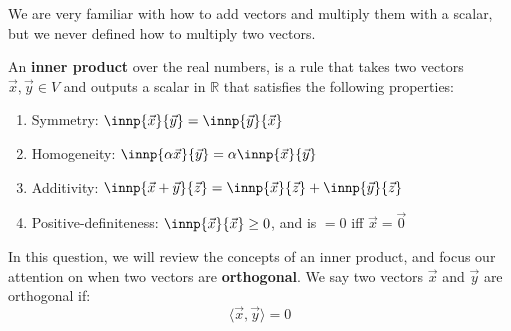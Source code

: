 

We are very familiar with how to add vectors and multiply them with a scalar, but we never defined how to multiply two vectors.

An \textbf{inner product} over the real numbers, is a rule that takes two vectors $\vec{x}, \vec{y} \in V$ and outputs a scalar in $\mathbb{R}$ that satisfies the following properties:


\begin{enumerate}[label=(\roman*)]
  \item Symmetry: $\innp{\vec{x}}{\vec{y}} = \innp{\vec{y}}{\vec{x}}$
  \item Homogeneity: $\innp{\alpha \vec{x}}{\vec{y}} = \alpha \innp{\vec{x}}{\vec{y}}$
  \item Additivity: $\innp{\vec{x}+\vec{y}}{\vec{z}} = \innp{\vec{x}}{\vec{z}} + \innp{\vec{y}}{\vec{z}}$
  \item Positive-definiteness: $\innp{\vec{x}}{\vec{x}} \geq 0$, and is $= 0$ iff $\vec{x} = \vec{0}$
\end{enumerate}

In this question, we will review the concepts of an inner product, and focus our attention on when two vectors are \textbf{orthogonal}. We say two vectors $\vec{x}$ and $\vec{y}$ are orthogonal if:
\begin{equation}
  \langle \vec{x}, \vec{y} \rangle = 0
\end{equation}

